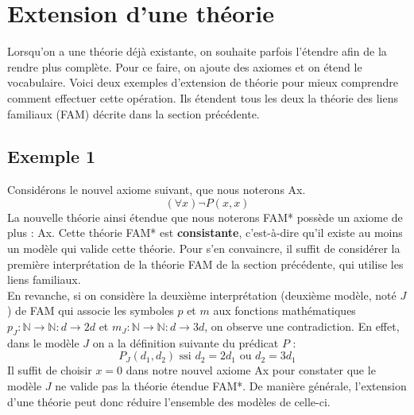 \section{Extension d'une théorie}
Lorsqu'on a une théorie déjà existante, on souhaite parfois l'étendre afin de la rendre plus complète. Pour ce faire, on ajoute des axiomes et on étend le vocabulaire. Voici deux exemples d'extension de théorie pour mieux comprendre comment effectuer cette opération. Ils étendent tous les deux la théorie des liens familiaux (FAM) décrite dans la section précédente.

\subsection*{Exemple 1}
Considérons le nouvel axiome suivant, que nous noterons Ax.
$$ (\forall x) \neg P(x,x) $$
La nouvelle théorie ainsi étendue que nous noterons FAM* possède un axiome de plus : Ax. Cette théorie FAM* est \textbf{consistante}, c'est-à-dire qu'il existe au moins un modèle qui valide cette théorie. Pour s'en convaincre, il suffit de considérer la première interprétation de la théorie FAM de la section précédente, qui utilise les liens familiaux. \\

En revanche, si on considère la deuxième interprétation (deuxième modèle, noté $J$) de FAM qui associe les symboles $p$ et $m$ aux fonctions mathématiques $p_J : \mathbb{N} \rightarrow \mathbb{N} : d \rightarrow 2d$ et $m_J : \mathbb{N} \rightarrow \mathbb{N} : d \rightarrow 3d$, on observe une contradiction. En effet, dans le modèle $J$ on a la définition suivante du prédicat $P$ :
$$ P_J(d_1, d_2) \textrm{ ssi } d_2 = 2d_1 \textrm{ ou } d_2 = 3d_1$$
Il suffit de choisir $x=0$ dans notre nouvel axiome Ax pour constater que le modèle $J$ ne valide pas la théorie étendue FAM*. De manière générale, l'extension d'une théorie peut donc réduire l'ensemble des modèles de celle-ci.

